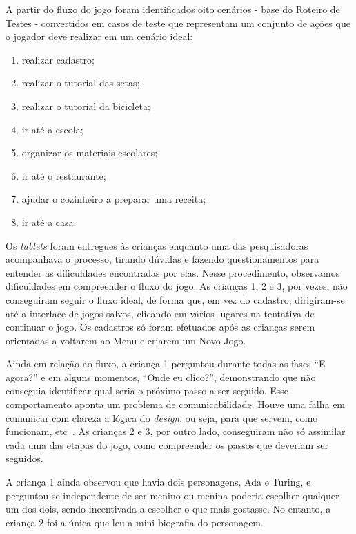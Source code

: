 A partir do fluxo do jogo foram identificados oito cenários - base do Roteiro de Testes - convertidos em casos de teste que representam um conjunto de ações que o jogador deve realizar em um cenário ideal: 

\begin{enumerate}
\item realizar cadastro; 
\item realizar o tutorial das setas; 
\item realizar o tutorial da bicicleta; 
\item ir até a escola; 
\item organizar os materiais escolares; 
\item ir até o restaurante; 
\item ajudar o cozinheiro a preparar uma receita; 
\item ir até a casa.
\end{enumerate}

Os \textit{tablets} foram entregues às crianças enquanto uma das pesquisadoras acompanhava o processo, tirando dúvidas e fazendo questionamentos para entender as dificuldades encontradas por elas. Nesse procedimento, observamos dificuldades em compreender o fluxo do jogo. As crianças 1, 2 e 3, por vezes, não conseguiram seguir o fluxo ideal, de forma que, em vez do cadastro, dirigiram-se até a interface de jogos salvos, clicando em vários lugares na tentativa de continuar o jogo. Os cadastros só foram efetuados após as crianças serem orientadas a voltarem ao Menu e criarem um Novo Jogo.

Ainda em relação ao fluxo, a criança 1 perguntou durante todas as fases “E agora?” e em alguns momentos, “Onde eu clico?”, demonstrando que não conseguia identificar qual seria o próximo passo a ser seguido. Esse comportamento aponta um problema de comunicabilidade. Houve uma falha em comunicar com clareza a lógica do \textit{design}, ou seja, para que servem, como funcionam, etc~\cite{grupo_de_pesquisa_em_engenharia_semiotica_serg_avaliacao_2012}. As crianças 2 e 3, por outro lado, conseguiram não só assimilar cada uma das etapas do jogo, como compreender os passos que deveriam ser seguidos.

A criança 1 ainda observou que havia dois personagens, Ada e Turing, e perguntou se independente de ser menino ou menina poderia escolher qualquer um dos dois, sendo incentivada a escolher o que mais gostasse. No entanto, a criança 2 foi a única que leu a mini biografia do personagem.

